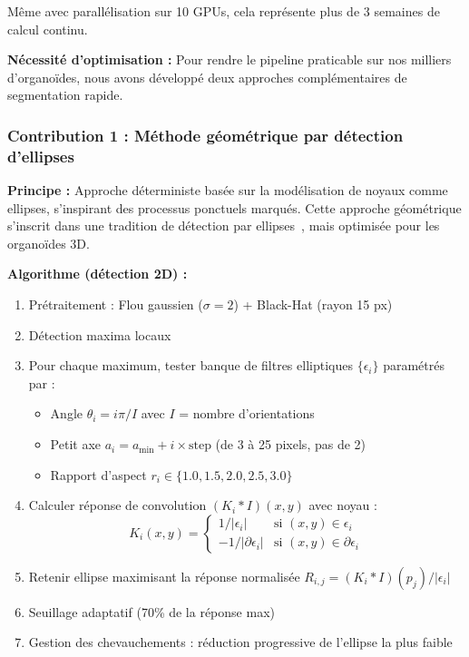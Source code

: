 Même avec parallélisation sur 10 GPUs, cela représente plus de 3 semaines de calcul continu.

\textbf{Nécessité d'optimisation :}
Pour rendre le pipeline praticable sur nos milliers d'organoïdes, nous avons développé deux approches complémentaires de segmentation rapide.

\subsubsection{Contribution 1 : Méthode géométrique par détection d'ellipses}

\textbf{Principe :}
Approche déterministe basée sur la modélisation de noyaux comme ellipses, s'inspirant des processus ponctuels marqués. Cette approche géométrique s'inscrit dans une tradition de détection par ellipses~\cite{Kirsten2023}, mais optimisée pour les organoïdes 3D.

\textbf{Algorithme (détection 2D) :}
\begin{enumerate}
    \item Prétraitement : Flou gaussien ($\sigma=2$) + Black-Hat (rayon 15 px)
    \item Détection maxima locaux
    \item Pour chaque maximum, tester banque de filtres elliptiques $\{\epsilon_i\}$ paramétrés par :
        \begin{itemize}
            \item Angle $\theta_i = i\pi / I$ avec $I$ = nombre d'orientations
            \item Petit axe $a_i = a_{\min} + i \times \text{step}$ (de 3 à 25 pixels, pas de 2)
            \item Rapport d'aspect $r_i \in \{1.0, 1.5, 2.0, 2.5, 3.0\}$
        \end{itemize}
    \item Calculer réponse de convolution $(K_i * I)(x, y)$ avec noyau :
        \[
        K_i(x, y) = \begin{cases}
            1/|\epsilon_i| & \text{si } (x, y) \in \epsilon_i \\
            -1/|\partial \epsilon_i| & \text{si } (x, y) \in \partial \epsilon_i
        \end{cases}
        \]
    \item Retenir ellipse maximisant la réponse normalisée $R_{i,j} = (K_i * I)(p_j) / |\epsilon_i|$
    \item Seuillage adaptatif (70\% de la réponse max)
    \item Gestion des chevauchements : réduction progressive de l'ellipse la plus faible
\end{enumerate}

